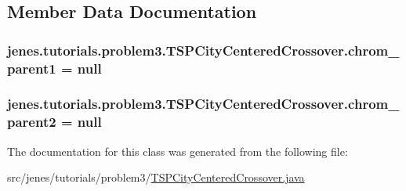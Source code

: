 \subsection{Member Data Documentation}
\hypertarget{classjenes_1_1tutorials_1_1problem3_1_1_t_s_p_city_centered_crossover_ad809abb1613db54c32389b8f826d298d}{
\subsubsection[{chrom\-\_\-parent1}]{ jenes.\-tutorials.\-problem3.\-T\-S\-P\-City\-Centered\-Crossover.\-chrom\-\_\-parent1 = null\hspace{0.3cm}{\ttfamily [private]}}}\label{classjenes_1_1tutorials_1_1problem3_1_1_t_s_p_city_centered_crossover_ad809abb1613db54c32389b8f826d298d}
\hypertarget{classjenes_1_1tutorials_1_1problem3_1_1_t_s_p_city_centered_crossover_a5a385a3e85a5cf8985d1f3dd7a28de7e}{
\subsubsection[{chrom\-\_\-parent2}]{ jenes.\-tutorials.\-problem3.\-T\-S\-P\-City\-Centered\-Crossover.\-chrom\-\_\-parent2 = null\hspace{0.3cm}{\ttfamily [private]}}}\label{classjenes_1_1tutorials_1_1problem3_1_1_t_s_p_city_centered_crossover_a5a385a3e85a5cf8985d1f3dd7a28de7e}


The documentation for this class was generated from the following file\-:\begin{DoxyCompactItemize}
\item 
src/jenes/tutorials/problem3/\hyperlink{problem3_2_t_s_p_city_centered_crossover_8java}{T\-S\-P\-City\-Centered\-Crossover.\-java}\end{DoxyCompactItemize}
